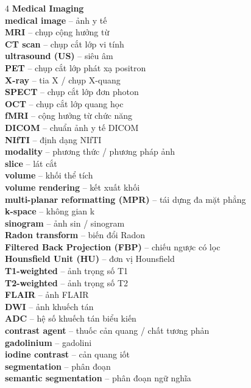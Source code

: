 \begin{multicols}{4}
\textbf{Medical Imaging}\\
\textbf{medical image} -- ảnh y tế\\
\textbf{MRI} -- chụp cộng hưởng từ\\
\textbf{CT scan} -- chụp cắt lớp vi tính\\
\textbf{ultrasound (US)} -- siêu âm\\
\textbf{PET} -- chụp cắt lớp phát xạ positron\\
\textbf{X-ray} -- tia X / chụp X-quang\\
\textbf{SPECT} -- chụp cắt lớp đơn photon\\
\textbf{OCT} -- chụp cắt lớp quang học\\
\textbf{fMRI} -- cộng hưởng từ chức năng\\
\textbf{DICOM} -- chuẩn ảnh y tế DICOM\\
\textbf{NIfTI} -- định dạng NIfTI\\
\textbf{modality} -- phương thức / phương pháp ảnh\\
\textbf{slice} -- lát cắt\\
\textbf{volume} -- khối thể tích\\
\textbf{volume rendering} -- kết xuất khối\\
\textbf{multi-planar reformatting (MPR)} -- tái dựng đa mặt phẳng\\
\textbf{k-space} -- không gian k\\
\textbf{sinogram} -- ảnh sin / sinogram\\
\textbf{Radon transform} -- biến đổi Radon\\
\textbf{Filtered Back Projection (FBP)} -- chiếu ngược có lọc\\
\textbf{Hounsfield Unit (HU)} -- đơn vị Hounsfield\\
\textbf{T1-weighted} -- ảnh trọng số T1\\
\textbf{T2-weighted} -- ảnh trọng số T2\\
\textbf{FLAIR} -- ảnh FLAIR\\
\textbf{DWI} -- ảnh khuếch tán\\
\textbf{ADC} -- hệ số khuếch tán biểu kiến\\
\textbf{contrast agent} -- thuốc cản quang / chất tương phản\\
\textbf{gadolinium} -- gadolini\\
\textbf{iodine contrast} -- cản quang iốt\\
\textbf{segmentation} -- phân đoạn\\
\textbf{semantic segmentation} -- phân đoạn ngữ nghĩa\\

\end{multicols}
